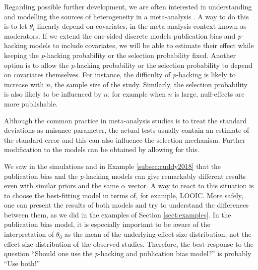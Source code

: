 \documentclass[useAMS,usenatbib,referee]{biom}
\begin{document}
Regarding possible further development, we are often interested in understanding and modelling the sources of heterogeneity in a meta-analysis \citep{thompson1994systematic}. A way to do this is to let $\theta_{i}$ linearly depend on covariates, in the meta-analysis context known as moderators. If we extend the one-sided discrete models publication bias and \textit{p}-hacking models to include covariates, we will be able to estimate their effect while keeping the \textit{p}-hacking probability or the selection probability fixed. Another option is to allow the \textit{p}-hacking probability or the selection probability to depend on covariates themselves. For instance, the difficulty of \textit{p}-hacking is likely to increase with $n$, the sample size of the study. Similarly, the selection probability is also likely to be influenced by $n$; for example when $n$ is large, null-effects are more publishable.

Although the common practice in meta-analysis studies is to treat the standard deviations as nuisance parameter, the actual tests usually contain an estimate of the standard error and this can also influence the selection mechanism. Further modification to the models can be obtained by allowing for this. 


We saw in the simulations and in Example \ref{subsec:cuddy2018} that the publication bias and the \textit{p}-hacking models can give remarkably different results even with similar priors and the same $\alpha$ vector. A way to react to this situation is to choose the best-fitting model in terms of, for example, LOOIC. More safely, one can present the results of both models and try to understand the differences between them, as we did in the examples of Section \ref{sect:examples}. In the publication bias model, it is especially important to be aware of the interpretation of $\theta_{0}$ as the mean of the underlying effect size distribution, not the effect size distribution of the observed studies. Therefore, the best response to the question \enquote{Should one use the \textit{p}-hacking and publication bias model?} is probably \enquote{Use both!}
\end{document}
